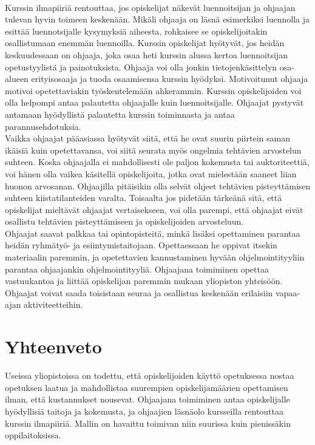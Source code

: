 \documentclass[finnish]{tktltiki2}
\theoremstyle{definition}
\theoremstyle{remark}
\begin{document}
\\
Kurssin ilmapiiriä rentouttaa, jos opiskelijat näkevät luennoitsijan ja ohjaajan tulevan hyvin toimeen keskenään. Mikäli ohjaaja on läsnä esimerkiksi luennolla ja esittää luennotsijalle kysymyksiä aiheesta, rohkaisee se opiskelijoitakin osallistumaan enemmän luennoilla. Kurssin opiskelijat hyötyvät, jos heidän keskuudessaan on ohjaaja, joka osaa heti kurssin alussa kertoa luennoitsijan opetustyylistä ja painotuksista. Ohjaaja voi olla jonkin tietojenkäsittelyn osa-alueen erityisosaaja ja tuoda osaamisensa kurssin hyödyksi. Motivoitunut ohjaaja motivoi opetettaviakin työskentelemään ahkerammin.\cite{Dickson11} Kurssin opiskelijoiden voi olla helpompi antaa palautetta ohjaajalle kuin luennoitsijalle.\cite{Morgan02} Ohjaajat pystyvät antamaan hyödyllistä palautetta kurssin toiminnasta ja antaa parannusehdotuksia.\cite{Decker06}
\\
Vaikka ohjaajat pääasiassa hyötyvät siitä, että he ovat suurin piirtein saman ikäisiä kuin opetettavansa, voi siitä seurata myös ongelmia tehtävien arvostelun suhteen. Koska ohjaajalla ei mahdollisesti ole paljon kokemusta tai auktoriteettiä, voi hänen olla vaikea käsitellä opiskelijoita, jotka ovat mielestään saaneet liian huonon arvosanan. Ohjaajilla pitäisikin olla selvät ohjeet tehtävien pisteyttämisen suhteen kiistatilanteiden varalta.\cite{Roberts95} Toisaalta jos pidetään tärkeänä sitä, että opiskelijat mieltävät ohjaajat vertaisekseen, voi olla parempi, että ohjaajat eivät osallistu tehtävien pisteyttämiseen ja opiskelijoiden arvosteluun. \cite{Morgan02}
\\
Ohjaajat saavat palkkaa tai opintopisteitä, minkä lisäksi opettaminen parantaa heidän ryhmätyö- ja esiintymistaitojaan. Opettaessaan he oppivat itsekin materiaalin paremmin,\cite{Reges03} ja opetettavien kannustaminen hyvään ohjelmointityyliin parantaa ohjaajankin ohjelmointityyliä.\cite{Roberts95} Ohjaajana toimiminen opettaa vastuukantoa ja liittää opiskelijan paremmin mukaan yliopiston yhteisöön.\cite{Dickson11} Ohjaajat voivat saada toisistaan seuraa ja osallistua keskenään erilaisiin vapaa-ajan aktiviteetteihin.\cite{Roberts95}







\section{Yhteenveto}
Useissa yliopistoissa on todettu, että opiskelijoiden käyttö opetuksessa nostaa opetuksen laatua ja mahdollistaa suurempien opiskelijamäärien opettamisen ilman, että kustannukset nousevat. Ohjaajana toimiminen antaa opiskelijalle hyödyllisiä taitoja ja kokemusta, ja ohjaajien läsnäolo kursseilla rentouttaa kurssin ilmapiiriä. Mallin on havaittu toimivan niin suurissa kuin pienissäkin oppilaitoksissa.




\end{document}
